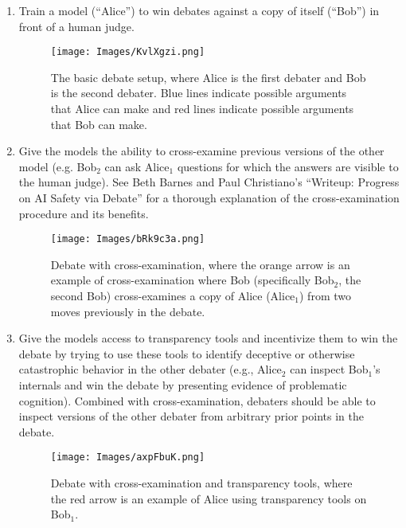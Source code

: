 \documentclass[
  onecolumn,
  natbib,
]{miri-tech-article}
\begin{document}
\begin{enumerate}
\item Train a model (``Alice'') to win debates against a copy of itself (``Bob'') in front of a human judge.

\vspace{4mm}

\begin{figure}[H]
  \centering
  \texttt{[image: Images/KvlXgzi.png]}
  \caption{The basic debate setup, where Alice is the first debater and Bob is the second debater. Blue lines indicate possible arguments that Alice can make and red lines indicate possible arguments that Bob can make.}
\end{figure}

\vspace{2mm}

\item Give the models the ability to cross-examine previous versions of the other model (e.g. Bob$_{2}$ can ask Alice$_{1}$ questions for which the answers are visible to the human judge). See Beth Barnes and Paul Christiano's ``Writeup: Progress on AI Safety via Debate'' for a thorough explanation of the cross-examination procedure and its benefits.\cite{debate_progress}

\vspace{4mm}

\begin{figure}[H]
  \centering
  \texttt{[image: Images/bRk9c3a.png]}
  \caption{Debate with cross-examination, where the orange arrow is an example of cross-examination where Bob (specifically Bob$_{2}$, the second Bob) cross-examines a copy of Alice (Alice$_{1}$) from two moves previously in the debate.}
\end{figure}

\vspace{2mm}

\item Give the models access to transparency tools and incentivize them to win the debate by trying to use these tools to identify deceptive or otherwise catastrophic behavior in the other debater (e.g., Alice$_{2}$ can inspect Bob$_{1}$'s internals and win the debate by presenting evidence of problematic cognition). Combined with cross-examination, debaters should be able to inspect versions of the other debater from arbitrary prior points in the debate.

\vspace{4mm}

\begin{figure}[h!]
  \centering
  \texttt{[image: Images/axpFbuK.png]}
  \caption{Debate with cross-examination and transparency tools, where the red arrow is an example of Alice using transparency tools on Bob$_{1}$.}
\end{figure}
\end{enumerate}
\end{document}
